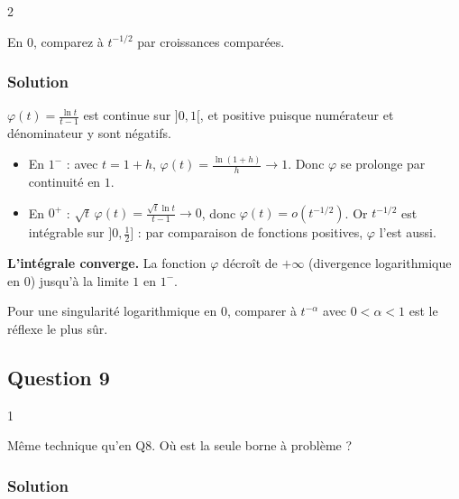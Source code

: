 \documentclass[11pt,a4paper]{article}
\providecommand{\tightlist}{\setlength{\itemsep}{0pt}\setlength{\parskip}{0pt}}
\begin{document}
\begin{indication}{2}

En \(0\), comparez à \(t^{-1/2}\) par croissances comparées.

\end{indication}

\hypertarget{solution-21}{%
\subsubsection{Solution}\label{solution-21}}

\(\varphi(t)=\frac{\ln t}{t-1}\) est continue sur \(]0,1[\), et positive puisque numérateur et dénominateur y sont négatifs.

\begin{itemize}
\tightlist
\item
  En \(1^-\) : avec \(t=1+h\), \(\varphi(t)=\frac{\ln(1+h)}{h}\to 1\). Donc \(\varphi\) se prolonge par continuité en \(1\).
\item
  En \(0^+\) : \(\sqrt t\,\varphi(t)=\frac{\sqrt t\ln t}{t-1}\to 0\), donc \(\varphi(t)=o(t^{-1/2})\). Or \(t^{-1/2}\) est intégrable sur \(]0,\frac12]\) : par comparaison de fonctions positives, \(\varphi\) l'est aussi.
\end{itemize}

\textbf{L'intégrale converge.} La fonction \(\varphi\) décroît de \(+\infty\) (divergence logarithmique en \(0\)) jusqu'à la limite \(1\) en \(1^-\).

\begin{methode}

Pour une singularité logarithmique en \(0\), comparer à \(t^{-\alpha}\) avec \(0<\alpha<1\) est le réflexe le plus sûr.

\end{methode}

\hypertarget{question-9}{%
\subsection{Question 9}\label{question-9}}

\begin{indication}{1}

Même technique qu'en Q8. Où est la seule borne à problème ?

\end{indication}

\hypertarget{solution-22}{%
\subsubsection{Solution}\label{solution-22}}
\end{document}
